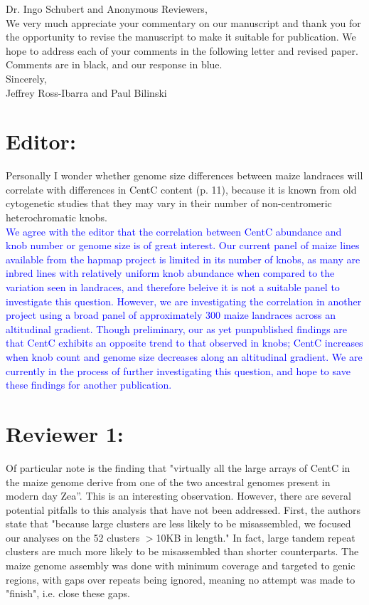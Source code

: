 \documentclass[]{article}
\newcommand{\res}[1]{\noindent \textcolor{blue}{{#1}} \\}
\begin{document}
\noindent Dr. Ingo Schubert and Anonymous Reviewers, \\

We very much appreciate your commentary on our manuscript and thank you for the opportunity to revise the manuscript to make it suitable for publication.  
We hope to address each of your comments in the following letter and revised paper. Comments are in black, and our response in blue.\\

\noindent Sincerely,\\

\noindent Jeffrey Ross-Ibarra and Paul Bilinski

\section*{Editor:}

Personally I wonder whether genome size differences between maize landraces will correlate with differences in CentC content (p. 11), because it is known from old cytogenetic studies that they may vary in their number of non-centromeric heterochromatic knobs. \\

\res{We agree with the editor that the correlation between CentC abundance and knob number or genome size is of great interest. 
 Our current panel of maize lines available from the hapmap project is limited in its number of knobs, as many are inbred lines with relatively uniform knob abundance when compared to the variation seen in landraces, and therefore beleive it is not a suitable panel to investigate this question.
However, we are investigating the correlation in another project using a broad panel of approximately 300 maize landraces across an altitudinal gradient.  
Though preliminary, our as yet punpublished findings are that CentC exhibits an opposite trend to that observed in knobs; CentC increases when knob count and genome size decreases along an altitudinal gradient.  
We are currently in the process of further investigating this question, and hope to save these findings for another publication.}

\section*{Reviewer 1:}

Of particular note is the finding that "virtually all the large arrays of CentC in the maize genome derive from one of the two ancestral genomes present in modern day Zea”.  This is an interesting observation.  However, there are several potential pitfalls to this analysis that have not been addressed.  First, the authors state that "because large clusters are less likely to be misassembled, we focused our analyses on the 52 clusters $>$10KB in length."  In fact, large tandem repeat clusters are much more likely to be misassembled than shorter counterparts. The maize genome assembly was done with minimum coverage and targeted to genic regions, with gaps over repeats being ignored, meaning no attempt was made to "finish", i.e. close these gaps.  \\
\end{document}
